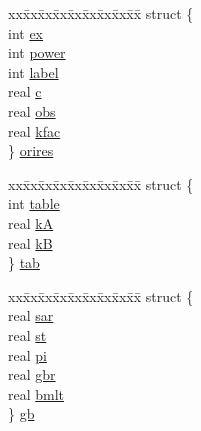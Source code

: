 \begin{DoxyCompactItemize}
\begin{tabbing}
\end{tabbing}\item 
\begin{tabbing}
xx\=xx\=xx\=xx\=xx\=xx\=xx\=xx\=xx\=\kill
struct \{\\
\>int \hyperlink{uniont__iparams_a53c2ced6507046f818862a7c117c4264}{ex}\\
\>int \hyperlink{uniont__iparams_a6f65dd78a5a547ddd4fc7b053875d533}{power}\\
\>int \hyperlink{uniont__iparams_a1c14cb25db59e5658ce18ce068c5cdf4}{label}\\
\>real \hyperlink{uniont__iparams_a6f12f82807f6b417c8982bbb5a27af83}{c}\\
\>real \hyperlink{uniont__iparams_a0674ccf6ebac406a01809b594e7497c9}{obs}\\
\>real \hyperlink{uniont__iparams_aa2047a1076195f900b14c9a5fbc12c85}{kfac}\\
\} \hyperlink{uniont__iparams_abf07be51a5c763743ebe34e676e4e42d}{orires}\\

\end{tabbing}\item 
\begin{tabbing}
xx\=xx\=xx\=xx\=xx\=xx\=xx\=xx\=xx\=\kill
struct \{\\
\>int \hyperlink{uniont__iparams_ae88015e9d16a950988b0b05eb90c63ce}{table}\\
\>real \hyperlink{uniont__iparams_ab13d91373ce6d97d0c3a8e7b9886b0af}{kA}\\
\>real \hyperlink{uniont__iparams_abda3baea609874bcf28f8a28b6e0a451}{kB}\\
\} \hyperlink{uniont__iparams_a79c859485899aa8761d018db30c1ac58}{tab}\\

\end{tabbing}\item 
\begin{tabbing}
xx\=xx\=xx\=xx\=xx\=xx\=xx\=xx\=xx\=\kill
struct \{\\
\>real \hyperlink{uniont__iparams_a46042eaae3e88c84bc680ea4d1108e84}{sar}\\
\>real \hyperlink{uniont__iparams_ae77e8a5af1b02825697a5520f754bb0a}{st}\\
\>real \hyperlink{uniont__iparams_a882ce1bd87228259c0185dac598e49e3}{pi}\\
\>real \hyperlink{uniont__iparams_a99d5340b9afa500ec28ed2511c91964f}{gbr}\\
\>real \hyperlink{uniont__iparams_a7f54768c60be5c76f2835aff5cd05d48}{bmlt}\\
\} \hyperlink{uniont__iparams_af00d729d3bc14c1984f1cfd9f51122c7}{gb}\\


\end{tabbing}
\end{DoxyCompactItemize}
